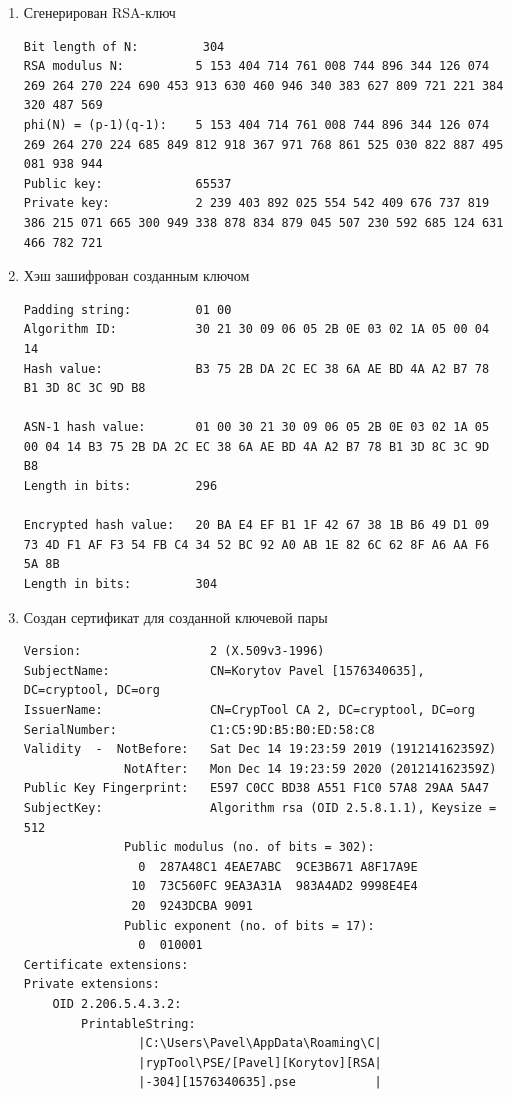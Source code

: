 \documentclass[a4paper, 14pt]{extarticle}
\begin{document}
\begin{enumerate}
\begin{enumerate}
        \item Сгенерирован RSA-ключ
        \begin{lstlisting}[style=framed_num,caption=ключ]
Bit length of N:         304
RSA modulus N:          5 153 404 714 761 008 744 896 344 126 074 269 264 270 224 690 453 913 630 460 946 340 383 627 809 721 221 384 320 487 569
phi(N) = (p-1)(q-1):    5 153 404 714 761 008 744 896 344 126 074 269 264 270 224 685 849 812 918 367 971 768 861 525 030 822 887 495 081 938 944
Public key:             65537
Private key:            2 239 403 892 025 554 542 409 676 737 819 386 215 071 665 300 949 338 878 834 879 045 507 230 592 685 124 631 466 782 721
        \end{lstlisting}
        \item Хэш зашифрован созданным ключом
        \begin{lstlisting}[style=framed_num,caption=шифрование текста]
Padding string:         01 00
Algorithm ID:           30 21 30 09 06 05 2B 0E 03 02 1A 05 00 04 14
Hash value:             B3 75 2B DA 2C EC 38 6A AE BD 4A A2 B7 78 B1 3D 8C 3C 9D B8

ASN-1 hash value:       01 00 30 21 30 09 06 05 2B 0E 03 02 1A 05 00 04 14 B3 75 2B DA 2C EC 38 6A AE BD 4A A2 B7 78 B1 3D 8C 3C 9D B8
Length in bits:         296

Encrypted hash value:   20 BA E4 EF B1 1F 42 67 38 1B B6 49 D1 09 73 4D F1 AF F3 54 FB C4 34 52 BC 92 A0 AB 1E 82 6C 62 8F A6 AA F6 5A 8B
Length in bits:         304
        \end{lstlisting}
        \item Создан сертификат для созданной ключевой пары
        \begin{lstlisting}[style=framed_num,caption=созданный сертификат]
Version:                  2 (X.509v3-1996)
SubjectName:              CN=Korytov Pavel [1576340635], DC=cryptool, DC=org
IssuerName:               CN=CrypTool CA 2, DC=cryptool, DC=org
SerialNumber:             C1:C5:9D:B5:B0:ED:58:C8
Validity  -  NotBefore:   Sat Dec 14 19:23:59 2019 (191214162359Z)
              NotAfter:   Mon Dec 14 19:23:59 2020 (201214162359Z)
Public Key Fingerprint:   E597 C0CC BD38 A551 F1C0 57A8 29AA 5A47 
SubjectKey:               Algorithm rsa (OID 2.5.8.1.1), Keysize = 512
              Public modulus (no. of bits = 302):
                0  287A48C1 4EAE7ABC  9CE3B671 A8F17A9E
               10  73C560FC 9EA3A31A  983A4AD2 9998E4E4
               20  9243DCBA 9091                       
              Public exponent (no. of bits = 17):
                0  010001                              
Certificate extensions:
Private extensions:
    OID 2.206.5.4.3.2:                     
        PrintableString:
                |C:\Users\Pavel\AppData\Roaming\C|
                |rypTool\PSE/[Pavel][Korytov][RSA|
                |-304][1576340635].pse           |
    

\end{lstlisting}
\end{enumerate}
\end{enumerate}
\end{document}
